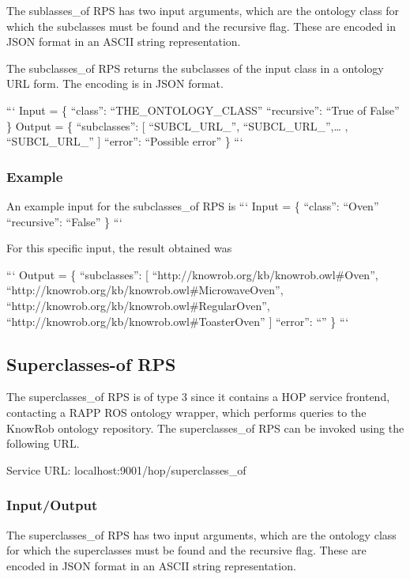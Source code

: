 The sublasses\-\_\-of R\-P\-S has two input arguments, which are the ontology class for which the subclasses must be found and the recursive flag. These are encoded in J\-S\-O\-N format in an A\-S\-C\-I\-I string representation.

The subclasses\-\_\-of R\-P\-S returns the subclasses of the input class in a ontology U\-R\-L form. The encoding is in J\-S\-O\-N format.

``` Input = \{ “class”\-: “\-T\-H\-E\-\_\-\-O\-N\-T\-O\-L\-O\-G\-Y\-\_\-\-C\-L\-A\-S\-S” “recursive”\-: “\-True of False” \} {\ttfamily  } Output = \{ “subclasses”\-: \mbox{[} “\-S\-U\-B\-C\-L\-\_\-\-U\-R\-L\-\_”, “\-S\-U\-B\-C\-L\-\_\-\-U\-R\-L\-\_”,… , “\-S\-U\-B\-C\-L\-\_\-\-U\-R\-L\-\_” \mbox{]} “error”\-: “\-Possible error” \} ``` \subsubsection*{Example}

An example input for the subclasses\-\_\-of R\-P\-S is ``` Input = \{ “class”\-: “\-Oven” “recursive”\-: “\-False” \} ```

For this specific input, the result obtained was

``` Output = \{ “subclasses”\-: \mbox{[} “http\-://knowrob.org/kb/knowrob.\-owl\#\-Oven”, “http\-://knowrob.org/kb/knowrob.\-owl\#\-Microwave\-Oven”, “http\-://knowrob.org/kb/knowrob.\-owl\#\-Regular\-Oven”, “http\-://knowrob.org/kb/knowrob.\-owl\#\-Toaster\-Oven” \mbox{]} “error”\-: “” \} ```

\subsection*{Superclasses-\/of R\-P\-S}

The superclasses\-\_\-of R\-P\-S is of type 3 since it contains a H\-O\-P service frontend, contacting a R\-A\-P\-P R\-O\-S ontology wrapper, which performs queries to the Know\-Rob ontology repository. The superclasses\-\_\-of R\-P\-S can be invoked using the following U\-R\-L.

Service U\-R\-L\-: {\ttfamily localhost\-:9001/hop/superclasses\-\_\-of}

\subsubsection*{Input/\-Output}

The superclasses\-\_\-of R\-P\-S has two input arguments, which are the ontology class for which the superclasses must be found and the recursive flag. These are encoded in J\-S\-O\-N format in an A\-S\-C\-I\-I string representation.

